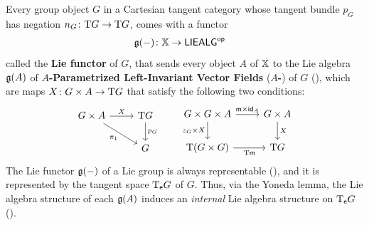\begin{content}
Every group object $G$ in a Cartesian tangent category whose tangent bundle $p_G$ has negation $n_G\colon\mathrm{T} G\to\mathrm{T} G$, comes with a functor
\begin{align*}
&\g(-)\colon\X\to\LieAlg^\op
\end{align*}
called the \textbf{Lie functor} of $G$, that sends every object $A$ of $\mathbb{X}$ to the Lie algebra $\mathfrak{g}(A)$ of \textbf{$A$-Parametrized Left-Invariant Vector Fields} (\textbf{$A$-\PLIVFs}\!) of $G$ (\cite[Definition~3.18]{lanfranchi:lie-correspondence-tangent-cats}), which are maps $X\colon G\times A\to\mathrm{T} G$ that satisfy the following two conditions:
\begin{equation*}
\begin{tikzcd}
{G\times A} & {\T G} \\
& G
\arrow["X", from=1-1, to=1-2]
\arrow["{\pi_1}"', from=1-1, to=2-2]
\arrow["{p_G}", from=1-2, to=2-2]
\end{tikzcd}\qquad
\begin{tikzcd}
{G\times G\times A} & {G\times A} \\
{\T(G\times G)} & {\T G}
\arrow["{\m\times\id_A}", from=1-1, to=1-2]
\arrow["{z_G\times X}"', from=1-1, to=2-1]
\arrow["X", from=1-2, to=2-2]
\arrow["{\T\m}"', from=2-1, to=2-2]
\end{tikzcd}
\end{equation*}
The Lie functor $\mathfrak{g}(-)$ of a Lie group is always representable (\cite[Theorem~4.20]{lanfranchi:lie-correspondence-tangent-cats}), and it is represented by the tangent space $\mathrm{T}_{\mathsf{e}} G$ of $G$. Thus, via the Yoneda lemma, the Lie algebra structure of each $\mathfrak{g}(A)$ induces an \emph{internal} Lie algebra structure on $\mathrm{T}_{\mathsf{e}} G$ (\cite[Theorem~5.4]{lanfranchi:lie-correspondence-tangent-cats}).
\end{content}

